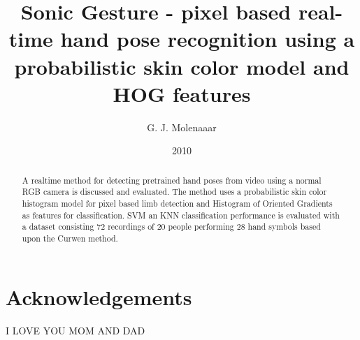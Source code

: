 \documentclass[a4paper]{report}
\begin{document}
\title{Sonic Gesture - pixel based real-time hand pose recognition using a probabilistic skin color model and HOG features}
\author{G. J. Molenaaar}
\date{2010}

\maketitle{}

\newpage{}
\newpage{}

\tableofcontents{}
\listoffigures{}
\listoftables{}

\chapter*{Acknowledgements}
I LOVE YOU MOM AND DAD

\begin{abstract}
A real\-time method for detecting pre\-trained hand poses from
video using a normal RGB camera is discussed and evaluated. The method uses a probabilistic skin color histogram model for pixel based limb detection and Histogram of Oriented Gradients as features for classification. SVM an KNN classification performance is evaluated with a dataset consisting 72 recordings of 20 people performing 28 hand symbols based upon the Curwen method. 

\end{abstract}
















\end{document}
